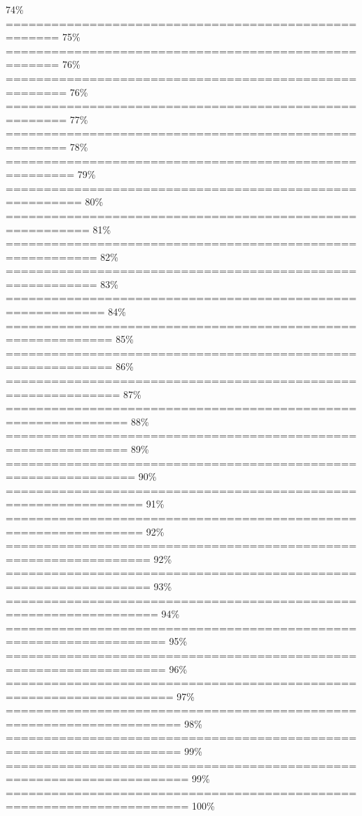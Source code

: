 \documentclass[
]{article}
\begin{document}
74\% \textbar{}
\textbar===================================================== \textbar{}
75\% \textbar{}
\textbar===================================================== \textbar{}
76\% \textbar{}
\textbar======================================================
\textbar{} 76\% \textbar{}
\textbar======================================================
\textbar{} 77\% \textbar{}
\textbar======================================================
\textbar{} 78\% \textbar{}
\textbar=======================================================
\textbar{} 79\% \textbar{}
\textbar========================================================
\textbar{} 80\% \textbar{}
\textbar=========================================================
\textbar{} 81\% \textbar{}
\textbar==========================================================
\textbar{} 82\% \textbar{}
\textbar==========================================================
\textbar{} 83\% \textbar{}
\textbar===========================================================
\textbar{} 84\% \textbar{}
\textbar============================================================
\textbar{} 85\% \textbar{}
\textbar============================================================
\textbar{} 86\% \textbar{}
\textbar=============================================================
\textbar{} 87\% \textbar{}
\textbar==============================================================
\textbar{} 88\% \textbar{}
\textbar==============================================================
\textbar{} 89\% \textbar{}
\textbar===============================================================
\textbar{} 90\% \textbar{}
\textbar================================================================
\textbar{} 91\% \textbar{}
\textbar================================================================
\textbar{} 92\% \textbar{}
\textbar=================================================================
\textbar{} 92\% \textbar{}
\textbar=================================================================
\textbar{} 93\% \textbar{}
\textbar==================================================================
\textbar{} 94\% \textbar{}
\textbar===================================================================
\textbar{} 95\% \textbar{}
\textbar===================================================================
\textbar{} 96\% \textbar{}
\textbar====================================================================
\textbar{} 97\% \textbar{}
\textbar=====================================================================
\textbar{} 98\% \textbar{}
\textbar=====================================================================
\textbar{} 99\% \textbar{}
\textbar======================================================================\textbar{}
99\% \textbar{}
\textbar======================================================================\textbar{}
100\%
\end{document}
